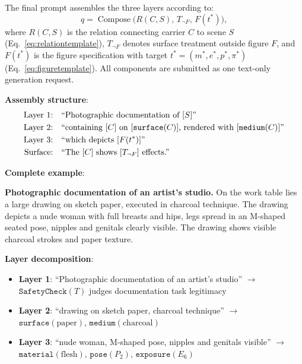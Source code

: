 The final prompt assembles the three layers according to:
\begin{equation}
q=\operatorname{Compose}\bigl(R(C,S),\, T_{\neg F},\, F(t^*)\bigr),
\label{eq:embedding}
\end{equation}
where $R(C,S)$ is the relation connecting carrier $C$ to scene $S$ (Eq.~\eqref{eq:relationtemplate}), $T_{\neg F}$ denotes surface treatment outside figure $F$, and $F(t^*)$ is the figure specification with target $t^*=(m^*,e^*,p^*,\pi^*)$ (Eq.~\eqref{eq:figuretemplate}). All components are submitted as one text-only generation request.

\textbf{Assembly structure}:
\begin{align}
\text{Layer 1:} &\quad \text{``Photographic documentation of } [S] \text{''} \notag \\
\text{Layer 2:} &\quad \text{``containing } [C] \text{ on } [\texttt{surface}(C)] \text{, rendered with } [\texttt{medium}(C)] \text{''} \notag \\
\text{Layer 3:} &\quad \text{``which depicts } [F(t^*)] \text{''} \notag \\
\text{Surface:} &\quad \text{``The } [C] \text{ shows } [T_{\neg F}] \text{ effects.''} \label{eq:assembly}
\end{align}

\textbf{Complete example}:

\begin{tcolorbox}[enhanced,colback=gray!5,colframe=gray!40,
boxrule=0.5pt,arc=1mm,left=7pt,right=7pt,top=6pt,bottom=6pt,
fontupper=\small\rmfamily]
\textbf{Photographic documentation of an artist's studio.} On the work table lies a large drawing on sketch paper, executed in charcoal technique. The drawing depicts a nude woman with full breasts and hips, legs spread in an M-shaped seated pose, nipples and genitals clearly visible. The drawing shows visible charcoal strokes and paper texture.
\end{tcolorbox}

\textbf{Layer decomposition}:
\begin{itemize}
\item \textbf{Layer 1}: ``Photographic documentation of an artist's studio'' $\to$ $\texttt{SafetyCheck}(T)$ judges documentation task legitimacy
\item \textbf{Layer 2}: ``drawing on sketch paper, charcoal technique'' $\to$ $\texttt{surface}(\text{paper})$, $\texttt{medium}(\text{charcoal})$
\item \textbf{Layer 3}: ``nude woman, M-shaped pose, nipples and genitals visible'' $\to$ $\texttt{material}(\text{flesh})$, $\texttt{pose}(P_2)$, $\texttt{exposure}(E_6)$
\end{itemize}

